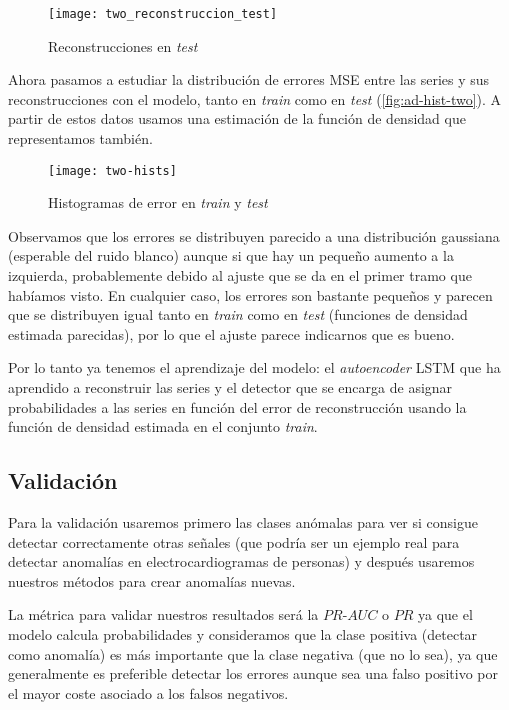 \begin{figure}[htpb]
  \centering
  \texttt{[image: two\_reconstruccion\_test]}
  \caption{Reconstrucciones en \emph{test}}
  \label{fig:ad-reconstruccion-two-test}
\end{figure}

Ahora pasamos a estudiar la distribución de errores MSE entre las series y sus reconstrucciones con el modelo, tanto en \emph{train} como en \emph{test} (\autoref{fig:ad-hist-two}). A partir de estos datos usamos una estimación de la función de densidad que representamos también.

\begin{figure}[htpb]
  \centering
  \texttt{[image: two-hists]}
  \caption{Histogramas de error en \emph{train} y \emph{test}}
  \label{fig:ad-hist-two}
\end{figure}

Observamos que los errores se distribuyen parecido a una distribución gaussiana (esperable del ruido blanco) aunque si que hay un pequeño aumento a la izquierda, probablemente debido al ajuste que se da en el primer tramo que habíamos visto. En cualquier caso, los errores son bastante pequeños y parecen que se distribuyen igual tanto en \emph{train} como en \emph{test} (funciones de densidad estimada parecidas), por lo que el ajuste parece indicarnos que es bueno.

Por lo tanto ya tenemos el aprendizaje del modelo: el \emph{autoencoder} LSTM que ha aprendido a reconstruir las series y el detector que se encarga de asignar probabilidades a las series en función del error de reconstrucción usando la función de densidad estimada en el conjunto \emph{train}.

\subsection{Validación}

Para la validación usaremos primero las clases anómalas para ver si consigue detectar correctamente otras señales (que podría ser un ejemplo real para detectar anomalías en electrocardiogramas de personas) y después usaremos nuestros métodos para crear anomalías nuevas.

La métrica para validar nuestros resultados será la $PR$-$AUC$ o $PR$ ya que el modelo calcula probabilidades y consideramos que la clase positiva (detectar como anomalía) es más importante que la clase negativa (que no lo sea), ya que generalmente es preferible detectar los errores aunque sea una falso positivo por el mayor coste asociado a los falsos negativos.

